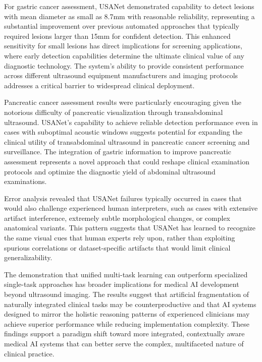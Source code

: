 For gastric cancer assessment, USANet demonstrated capability to detect lesions with mean diameter as small as 8.7mm with reasonable reliability, representing a substantial improvement over previous automated approaches that typically required lesions larger than 15mm for confident detection. This enhanced sensitivity for small lesions has direct implications for screening applications, where early detection capabilities determine the ultimate clinical value of any diagnostic technology. The system's ability to provide consistent performance across different ultrasound equipment manufacturers and imaging protocols addresses a critical barrier to widespread clinical deployment.

Pancreatic cancer assessment results were particularly encouraging given the notorious difficulty of pancreatic visualization through transabdominal ultrasound. USANet's capability to achieve reliable detection performance even in cases with suboptimal acoustic windows suggests potential for expanding the clinical utility of transabdominal ultrasound in pancreatic cancer screening and surveillance. The integration of gastric information to improve pancreatic assessment represents a novel approach that could reshape clinical examination protocols and optimize the diagnostic yield of abdominal ultrasound examinations.

Error analysis revealed that USANet failures typically occurred in cases that would also challenge experienced human interpreters, such as cases with extensive artifact interference, extremely subtle morphological changes, or complex anatomical variants. This pattern suggests that USANet has learned to recognize the same visual cues that human experts rely upon, rather than exploiting spurious correlations or dataset-specific artifacts that would limit clinical generalizability.

The demonstration that unified multi-task learning can outperform specialized single-task approaches has broader implications for medical AI development beyond ultrasound imaging. The results suggest that artificial fragmentation of naturally integrated clinical tasks may be counterproductive and that AI systems designed to mirror the holistic reasoning patterns of experienced clinicians may achieve superior performance while reducing implementation complexity. These findings support a paradigm shift toward more integrated, contextually aware medical AI systems that can better serve the complex, multifaceted nature of clinical practice.
